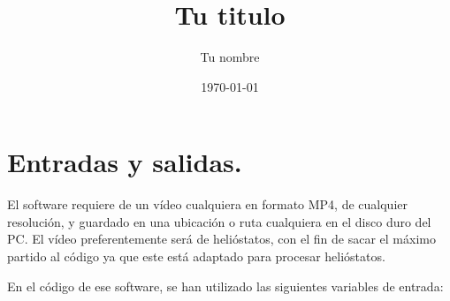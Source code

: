 \documentclass[12pt]{article}
\title{Tu titulo}					%
\author{Tu nombre}					%
\date{\today}						%
\begin{document}
\tableofcontents
\pagebreak


\section{Entradas y salidas.}

El software requiere de un vídeo cualquiera en formato MP4, de cualquier resolución, y guardado en una ubicación o ruta cualquiera en el disco duro del PC. El vídeo preferentemente será de helióstatos, con el fin de sacar el máximo partido al código ya que este está adaptado para procesar helióstatos.

En el código de ese software, se han utilizado las siguientes variables de entrada:
\end{document}
